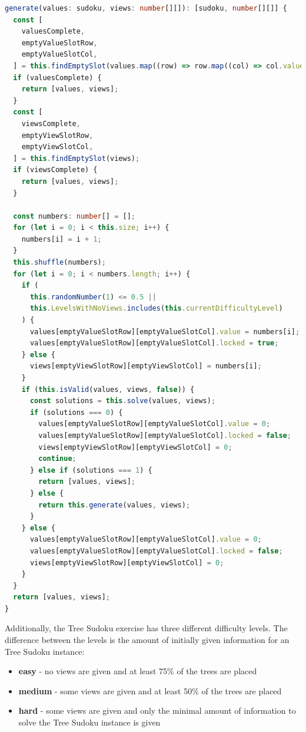 \begin{lstlisting}[language=TypeScript,caption={Generation algorithm for a Tree Sudoku instance},label={lst:sudokuGenerator}]
generate(values: sudoku, views: number[][]): [sudoku, number[][]] {
  const [
    valuesComplete,
    emptyValueSlotRow,
    emptyValueSlotCol,
  ] = this.findEmptySlot(values.map((row) => row.map((col) => col.value)));
  if (valuesComplete) {
    return [values, views];
  }
  const [
    viewsComplete,
    emptyViewSlotRow,
    emptyViewSlotCol,
  ] = this.findEmptySlot(views);
  if (viewsComplete) {
    return [values, views];
  }

  const numbers: number[] = [];
  for (let i = 0; i < this.size; i++) {
    numbers[i] = i + 1;
  }
  this.shuffle(numbers);
  for (let i = 0; i < numbers.length; i++) {
    if (
      this.randomNumber(1) <= 0.5 ||
      this.LevelsWithNoViews.includes(this.currentDifficultyLevel)
    ) {
      values[emptyValueSlotRow][emptyValueSlotCol].value = numbers[i];
      values[emptyValueSlotRow][emptyValueSlotCol].locked = true;
    } else {
      views[emptyViewSlotRow][emptyViewSlotCol] = numbers[i];
    }
    if (this.isValid(values, views, false)) {
      const solutions = this.solve(values, views);
      if (solutions === 0) {
        values[emptyValueSlotRow][emptyValueSlotCol].value = 0;
        values[emptyValueSlotRow][emptyValueSlotCol].locked = false;
        views[emptyViewSlotRow][emptyViewSlotCol] = 0;
        continue;
      } else if (solutions === 1) {
        return [values, views];
      } else {
        return this.generate(values, views);
      }
    } else {
      values[emptyValueSlotRow][emptyValueSlotCol].value = 0;
      values[emptyValueSlotRow][emptyValueSlotCol].locked = false;
      views[emptyViewSlotRow][emptyViewSlotCol] = 0;
    }
  }
  return [values, views];
}
\end{lstlisting}

Additionally, the Tree Sudoku exercise has three different difficulty levels. The difference between the levels is the amount of initially given information for an Tree Sudoku instance:

\begin{itemize}
    \item \textbf{easy} - no views are given and at least 75\% of the trees are placed
    \item \textbf{medium} - some views are given and at least 50\% of the trees are placed
    \item \textbf{hard} - some views are given and only the minimal amount of information to solve the Tree Sudoku instance is given
\end{itemize}

